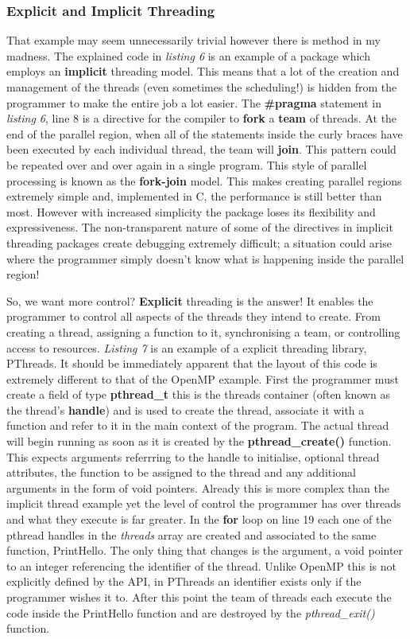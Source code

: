 \documentclass[11pt]{article} %
\begin{document}
\subsubsection*{Explicit and Implicit Threading}
That example may seem unnecessarily trivial however there is method in my madness. The explained code in {\it listing 6} is an example of a package which employs an {\bf implicit} threading model. This means that a lot of the creation and management of the threads (even sometimes the scheduling!) is hidden from the programmer to make the entire job a lot easier. The {\bf \#pragma} statement in {\it listing 6}, line 8 is a directive for the compiler to {\bf fork} a {\bf team} of threads. At the end of the parallel region, when all of the statements inside the curly braces have been executed by each individual thread, the team will {\bf join}. This pattern could be repeated over and over again in a single program. This style of parallel processing is known as the {\bf fork-join} model. This makes creating parallel regions extremely simple and, implemented in C, the performance is still better than most. However with increased simplicity the package loses its flexibility and expressiveness.\cite[p83]{ref14} The non-transparent nature of some of the directives in implicit threading packages create debugging extremely difficult; a situation could arise where the programmer simply doesn't know what is happening inside the parallel region!

So, we want more control? {\bf Explicit} threading is the answer! It enables the programmer to control all aspects of the threads they intend to create. From creating a thread, assigning a function to it, synchronising a team, or controlling access to resources. {\it Listing 7} is an example of a explicit threading library, PThreads. It should be immediately apparent that the layout of this code is extremely different to that of the OpenMP example. First the programmer must create a field of type {\bf pthread\_t} this is the threads container (often known as the thread's {\bf handle}) and is used to create the thread, associate it with a function and refer to it in the main context of the program. The actual thread will begin running as soon as it is created by the {\bf pthread\_create()} function. This expects arguments referrring to the handle to initialise, optional thread attributes, the function to be assigned to the thread and any additional arguments in the form of void pointers. Already this is more complex than the implicit thread example yet the level of control the programmer has over threads and what they execute is far greater.  \cite[p89]{ref14} In the {\bf for} loop on line 19 each one of the pthread handles in the {\it threads} array are created and associated to the same function, PrintHello. The only thing that changes is the argument, a void pointer to an integer referencing the identifier of the thread. Unlike OpenMP this is not explicitly defined by the API, in PThreads an identifier exists only if the programmer wishes it to. After this point the team of threads each execute the code inside the PrintHello function and are destroyed by the {\it pthread\_exit()} function. 
\end{document}
